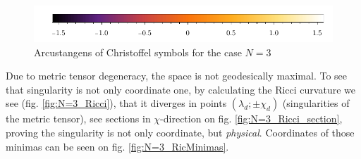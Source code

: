\begin{figure}[h]
\begin{tabular}{cc}
    \end{tabular}
\includegraphics{../img/N=3_barA.pdf}
    \caption{Arcustangens of Christoffel symbols for the case $N=3$}
    \label{fig:N=3_G}
\end{figure}

Due to metric tensor degeneracy, the space is not geodesically maximal. To see that singularity is not only coordinate one, by calculating the Ricci curvature we see (fig. \ref{fig:N=3_Ricci}), that it diverges in points $(\lambda_d;\pm\chi_d)$ (singularities of the metric tensor), see sections in $\chi$-direction on fig. \ref{fig:N=3_Ricci_section}, proving the singularity is not only coordinate, but \emph{physical}. Coordinates of those minimas can be seen on fig. \ref{fig:N=3_RicMinimas}.

